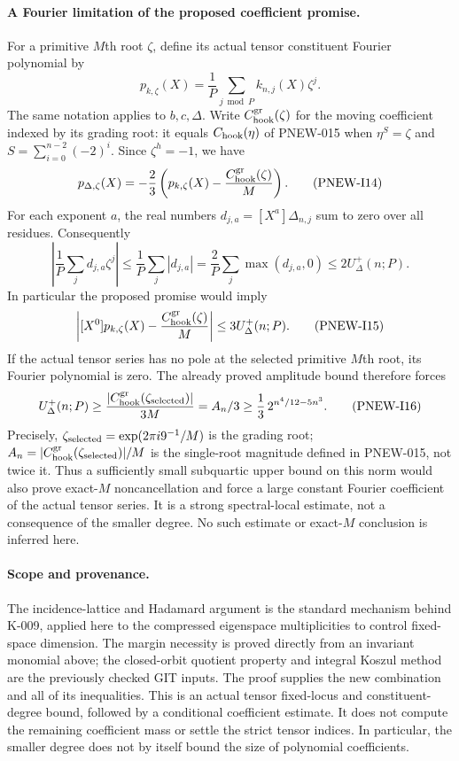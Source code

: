 \paragraph{A Fourier limitation of the proposed coefficient promise.}
For a primitive $M$th root $\zeta$, define its actual tensor
constituent Fourier polynomial by
\[
 p_{k,\zeta}(X)=\frac1P\sum_{j\bmod P}k_{n,j}(X)\zeta^j.
\]
The same notation applies to $b,c,\Delta$. Write
$C_{\rm hook}^{\rm gr}(\zeta)$ for the moving coefficient
indexed by its grading root: it equals $C_{\rm hook}(\eta)$
of PNEW-015 when $\eta^S=\zeta$ and
$S=\sum_{i=0}^{n-2}(-2)^i$. Since $\zeta^h=-1$, we have
\[
 p_{\Delta,\zeta}(X)
   =-\frac23\left(p_{k,\zeta}(X)
                       -\frac{C_{\rm hook}^{\rm gr}(\zeta)}M\right).
                                                        \tag{PNEW-I14}
\]
For each exponent $a$, the real numbers
$d_{j,a}=[X^a]\Delta_{n,j}$ sum to zero over all residues.
Consequently
\[
 \left|\frac1P\sum_jd_{j,a}\zeta^j\right|
 \le\frac1P\sum_j|d_{j,a}|
 =\frac2P\sum_j\max(d_{j,a},0)
 \le2U_\Delta^+(n;P).
\]
In particular the proposed promise would imply
\[
 \left|[X^0]p_{k,\zeta}(X)
                       -\frac{C_{\rm hook}^{\rm gr}(\zeta)}M\right|
       \le3U_\Delta^+(n;P).                            \tag{PNEW-I15}
\]
If the actual tensor series has no pole at the selected primitive
$M$th root, its Fourier polynomial is zero. The already proved
amplitude bound therefore forces
\[
 U_\Delta^+(n;P)
      \ge\frac{|C_{\rm hook}^{\rm gr}(\zeta_{\rm selected})|}{3M}
       =A_n/3
        \ge\frac13\,2^{n^4/12-5n^3}.                  \tag{PNEW-I16}
\]
Precisely, $\zeta_{\rm selected}=\exp(2\pi i9^{-1}/M)$ is
the grading root; $A_n=|C_{\rm hook}^{\rm gr}(\zeta_{\rm selected})|/M$
is the single-root magnitude defined in PNEW-015, not twice it.
Thus a sufficiently small subquartic upper bound on this norm
would also prove exact-$M$ noncancellation and force a large constant
Fourier coefficient of the actual tensor series. It is a strong
spectral-local estimate, not a consequence of the smaller degree.
No such estimate or exact-$M$ conclusion is inferred here.

\paragraph{Scope and provenance.}
The incidence-lattice and Hadamard argument is the standard mechanism
behind K-009, applied here to the compressed eigenspace multiplicities
to control fixed-space dimension. The margin necessity is proved
directly from an invariant monomial above; the closed-orbit quotient
property and integral Koszul method are the previously checked GIT
inputs. The proof supplies the new combination
and all of its inequalities. This is an actual tensor fixed-locus and
constituent-degree bound, followed by a conditional coefficient
estimate. It does not compute the remaining coefficient mass or
settle the strict tensor indices. In particular, the smaller degree
does not by itself bound the size of polynomial coefficients.

